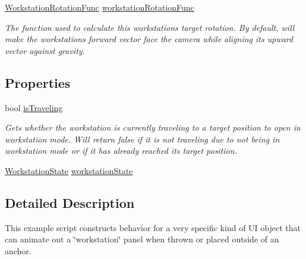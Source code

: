 \begin{DoxyCompactItemize}
\mbox{\hyperlink{class_leap_1_1_unity_1_1_examples_1_1_workstation_behaviour_example_a96412e8fc922be4561a1017293783c9a}{Workstation\+Rotation\+Func}} \mbox{\hyperlink{class_leap_1_1_unity_1_1_examples_1_1_workstation_behaviour_example_aa4075ce7f97ba3a7c7184940e0add199}{workstation\+Rotation\+Func}}
\begin{DoxyCompactList}\small\item\em The function used to calculate this workstation\textquotesingle{}s target rotation. By default, will make the workstation\textquotesingle{}s forward vector face the camera while aligning its upward vector against gravity. \end{DoxyCompactList}\end{DoxyCompactItemize}
\subsection*{Properties}
\begin{DoxyCompactItemize}
\item 
bool \mbox{\hyperlink{class_leap_1_1_unity_1_1_examples_1_1_workstation_behaviour_example_af8dc40bc97d0162d01fdcb5a446da67a}{is\+Traveling}}
\begin{DoxyCompactList}\small\item\em Gets whether the workstation is currently traveling to a target position to open in workstation mode. Will return false if it is not traveling due to not being in workstation mode or if it has already reached its target position. \end{DoxyCompactList}\item 
\mbox{\hyperlink{class_leap_1_1_unity_1_1_examples_1_1_workstation_behaviour_example_ae21c3ce4f1aac3e1920073e0e674cbcc}{Workstation\+State}} \mbox{\hyperlink{class_leap_1_1_unity_1_1_examples_1_1_workstation_behaviour_example_a84dc1a1d33dd9fbba06cc75fb3577323}{workstation\+State}}
\end{DoxyCompactItemize}


\subsection{Detailed Description}
This example script constructs behavior for a very specific kind of UI object that can animate out a \char`\"{}workstation\char`\"{} panel when thrown or placed outside of an anchor. 


